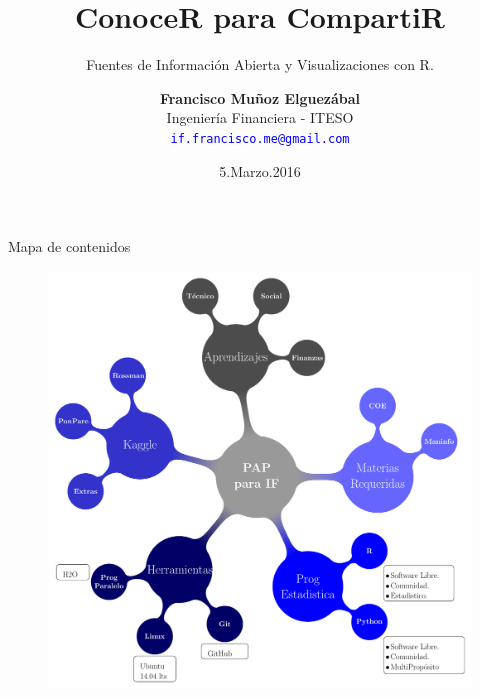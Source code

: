 \documentclass{IFFranciscoME}\usepackage[]{graphicx}\usepackage[]{color}
\title[Open Data Day]{ConoceR para CompartiR}
\subtitle{Fuentes de Informaci\'on Abierta y Visualizaciones con R.}
\author{%
    \textbf{Francisco Mu\~noz Elguez\'abal} \\
    Ingenier\'ia Financiera - ITESO\\
    \textcolor{blue}{\texttt{if.francisco.me@gmail.com}}}
\institute[ITESO]
{  }
\date{5.Marzo.2016}
\begin{document}

\begin{frame}{}
  \titlepage
\end{frame}


\begin{frame}{Mapa de contenidos}

\begin{figure}[H]
\centering
\includegraphics[scale=.36]{MindMap.pdf}
\end{figure}

\end{frame}

\end{document}
